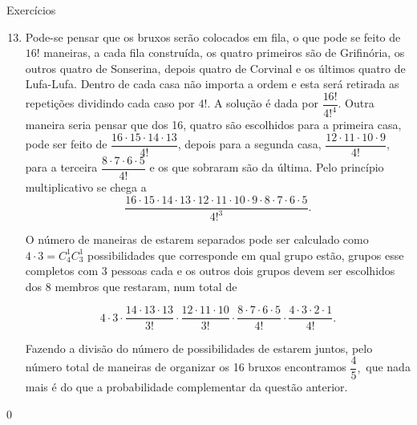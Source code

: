 \begin{answer}{Exercícios}
{\exerciselist
\begin{enumerate}\setcounter{enumi}{12}
\item Pode-se pensar que os bruxos serão colocados em fila, o que pode se feito de $16!$ maneiras, a cada fila construída, os quatro primeiros são de Grifinória, os outros quatro de Sonserina, depois quatro de Corvinal e os últimos quatro de Lufa-Lufa. Dentro de cada casa não importa a ordem e esta será retirada as repetições dividindo cada caso por $4!$. A solução é dada por $\dfrac{16!}{4!^4}.$ Outra maneira seria pensar que dos 16, quatro são escolhidos para a primeira casa, pode ser feito de $\dfrac{16 \cdot 15 \cdot 14 \cdot 13}{4!}$, depois para a segunda casa, $\dfrac{12 \cdot 11 \cdot 10 \cdot 9}{4!}$, para a terceira $\dfrac{8 \cdot 7 \cdot 6 \cdot 5}{4!}$ e os que sobraram são da última. Pelo princípio multiplicativo se chega a $$\dfrac{16 \cdot 15 \cdot 14 \cdot 13 \cdot 12 \cdot 11 \cdot 10 \cdot 9 \cdot8 \cdot 7 \cdot 6 \cdot 5 }{4!^3}.$$
    
O número de maneiras de estarem separados pode ser calculado como $4\cdot 3 = C_{4}^{1} C_{3}^{1}$ possibilidades que corresponde em qual grupo estão, grupos esse completos com 3 pessoas cada e os outros dois grupos  devem ser escolhidos dos 8 membros que restaram, num total de

$$ 4\cdot 3 \cdot \dfrac{14 \cdot 13 \cdot 13}{3!}\cdot \dfrac{12 \cdot 11 \cdot 10 }{3!} \cdot \dfrac{8\cdot 7 \cdot 6 \cdot 5}{4!}  \cdot \dfrac{4\cdot 3 \cdot 2 \cdot 1}{4!}.$$
  
Fazendo a divisão do número de possibilidades de estarem juntos, pelo número total de maneiras de organizar os 16 bruxos encontramos $\dfrac{4}{5},$ que nada mais é do que a probabilidade complementar da questão anterior.   
\end{enumerate}
}{0}
\end{answer}

\exercise

